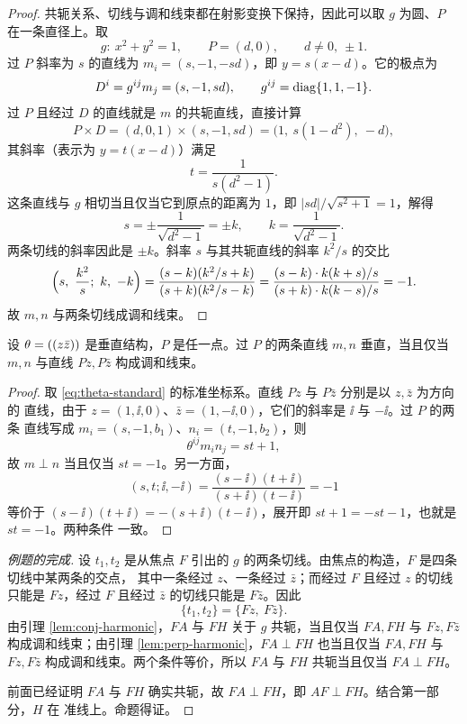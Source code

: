 \begin{proof}
共轭关系、切线与调和线束都在射影变换下保持，因此可以取 $g$ 为圆、$P$ 在一条直径上。取
\[
g:\ x^2+y^2=1,\qquad P=(d,0),\qquad d\ne0,\ \pm1 .
\]
过 $P$ 斜率为 $s$ 的直线为 $m_i=(s,-1,-sd)$，即 $y=s(x-d)$。它的极点为
\[
D^i=g^{ij}m_j=(s,-1,sd),\qquad g^{ij}=\operatorname{diag}\{1,1,-1\}.
\]
过 $P$ 且经过 $D$ 的直线就是 $m$ 的共轭直线，直接计算
\[
P\times D=(d,0,1)\times(s,-1,sd)=\bigl(1,\ s(1-d^2),\ -d\bigr),
\]
其斜率（表示为 $y=t(x-d)$）满足
\[
t=\frac{1}{s(d^2-1)}.
\]
这条直线与 $g$ 相切当且仅当它到原点的距离为 $1$，即
$|sd|/\sqrt{s^2+1}=1$，解得
\[
s=\pm\frac{1}{\sqrt{d^2-1}}=\pm k,\qquad k=\frac{1}{\sqrt{d^2-1}} .
\]
两条切线的斜率因此是 $\pm k$。斜率 $s$ 与其共轭直线的斜率 $k^2/s$ 的交比
\[
\Bigl(s,\ \frac{k^2}{s};\ k,\ -k\Bigr)
=\frac{(s-k)(k^2/s+k)}{(s+k)(k^2/s-k)}
=\frac{(s-k)\cdot k(k+s)/s}{(s+k)\cdot k(k-s)/s}
=-1 .
\]
故 $m,n$ 与两条切线成调和线束。
\end{proof}

\begin{lemma}\label{lem:perp-harmonic}
设 $\theta=((z\bar z))$ 是垂直结构，$P$ 是任一点。过 $P$ 的两条直线 $m,n$ 垂直，当且仅当
$m,n$ 与直线 $Pz,P\bar z$ 构成调和线束。
\end{lemma}

\begin{proof}
取 \eqref{eq:theta-standard} 的标准坐标系。直线 $Pz$ 与 $P\bar z$ 分别是以 $z,\bar z$ 为方向的
直线，由于 $z=(1,\ii,0)$、$\bar z=(1,-\ii,0)$，它们的斜率是 $\ii$ 与 $-\ii$。过 $P$ 的两条
直线写成 $m_i=(s,-1,b_1)$、$n_i=(t,-1,b_2)$，则
\[
\theta^{ij}m_in_j=st+1,
\]
故 $m\perp n$ 当且仅当 $st=-1$。另一方面，
\[
(s,t;\ii,-\ii)
=\frac{(s-\ii)(t+\ii)}{(s+\ii)(t-\ii)}
=-1
\]
等价于 $(s-\ii)(t+\ii)=-(s+\ii)(t-\ii)$，展开即 $st+1=-st-1$，也就是 $st=-1$。两种条件
一致。
\end{proof}

\begin{proof}[例题的完成]
设 $t_1,t_2$ 是从焦点 $F$ 引出的 $g$ 的两条切线。由焦点的构造，$F$ 是四条切线中某两条的交点，
其中一条经过 $z$、一条经过 $\bar z$；而经过 $F$ 且经过 $z$ 的切线只能是 $Fz$，经过 $F$ 且经过
$\bar z$ 的切线只能是 $F\bar z$。因此
\[
\{t_1,t_2\}=\{Fz,\ F\bar z\}.
\]
由引理 \ref{lem:conj-harmonic}，$FA$ 与 $FH$ 关于 $g$ 共轭，当且仅当 $FA,FH$ 与 $Fz,F\bar z$
构成调和线束；由引理 \ref{lem:perp-harmonic}，$FA\perp FH$ 也当且仅当 $FA,FH$ 与
$Fz,F\bar z$ 构成调和线束。两个条件等价，所以 $FA$ 与 $FH$ 共轭当且仅当 $FA\perp FH$。

前面已经证明 $FA$ 与 $FH$ 确实共轭，故 $FA\perp FH$，即 $AF\perp FH$。结合第一部分，$H$ 在
准线上。命题得证。
\end{proof}

